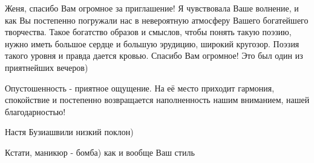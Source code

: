 \begin{itemize}

Женя, спасибо Вам огромное за приглашение! Я чувствовала Ваше волнение, и как
Вы постепенно погружали нас в невероятную атмосферу Вашего богатейшего
творчества. Такое богатство образов и смыслов, чтобы понять такую поэзию, нужно
иметь большое сердце и большую эрудицию, широкий кругозор. Поэзия такого уровня
и правда дается кровью. Спасибо Вам огромное! Это был один из приятнейших
вечеров)

Опустошенность - приятное ощущение. На её место приходит гармония, спокойствие
и постепенно возвращается наполненность нашим вниманием, нашей благодарностью!


Настя Бузиашвили низкий поклон)


Кстати, маникюр - бомба) как и вообще Ваш стиль

\end{itemize}
